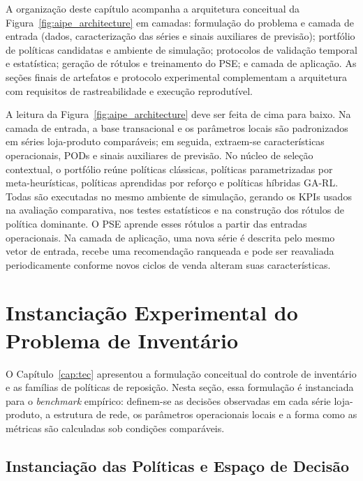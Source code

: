 A organização deste capítulo acompanha a arquitetura conceitual da Figura~\ref{fig:aipe_architecture} em camadas: formulação do problema e camada de entrada (dados, caracterização das séries e sinais auxiliares de previsão); portfólio de políticas candidatas e ambiente de simulação; protocolos de validação temporal e estatística; geração de rótulos e treinamento do PSE; e camada de aplicação. As seções finais de artefatos e protocolo experimental complementam a arquitetura com requisitos de rastreabilidade e execução reprodutível.



A leitura da Figura~\ref{fig:aipe_architecture} deve ser feita de cima para baixo. Na camada de entrada, a base transacional e os parâmetros locais são padronizados em séries loja-produto comparáveis; em seguida, extraem-se características operacionais, PODs e sinais auxiliares de previsão. No núcleo de seleção contextual, o portfólio reúne políticas clássicas, políticas parametrizadas por meta-heurísticas, políticas aprendidas por reforço e políticas híbridas GA-RL. Todas são executadas no mesmo ambiente de simulação, gerando os KPIs usados na avaliação comparativa, nos testes estatísticos e na construção dos rótulos de política dominante. O PSE aprende esses rótulos a partir das entradas operacionais. Na camada de aplicação, uma nova série é descrita pelo mesmo vetor de entrada, recebe uma recomendação ranqueada e pode ser reavaliada periodicamente conforme novos ciclos de venda alteram suas características.

\section{Instanciação Experimental do Problema de Inventário}
\label{sec:formulacao}

O Capítulo~\ref{cap:tec} apresentou a formulação conceitual do controle de inventário e as famílias de políticas de reposição. Nesta seção, essa formulação é instanciada para o \textit{benchmark} empírico: definem-se as decisões observadas em cada série loja-produto, a estrutura de rede, os parâmetros operacionais locais e a forma como as métricas são calculadas sob condições comparáveis.

\subsection{Instanciação das Políticas e Espaço de Decisão}

